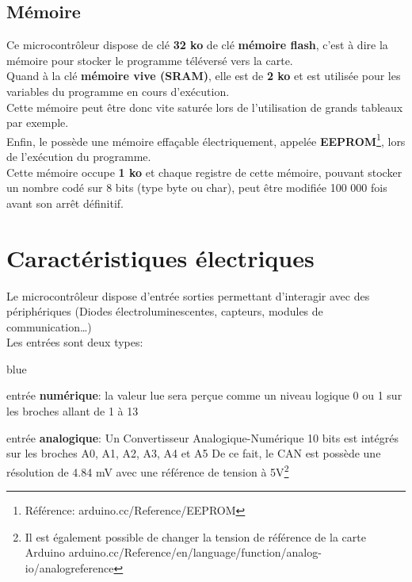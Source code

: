 \subsection{Mémoire}

Ce microcontrôleur dispose de clé \textbf{32 ko} de clé \textbf{mémoire flash}, c'est à dire la mémoire 
pour stocker le programme téléversé vers la carte. \\


Quand à la clé \textbf{mémoire vive (SRAM)}, elle est de \textbf{2 ko} et est utilisée pour les 
variables du programme en cours d’exécution. \\
Cette mémoire peut être donc vite saturée lors de l'utilisation de grands tableaux par exemple. \\


Enfin, le  possède une mémoire effaçable électriquement, appelée \textbf{EEPROM}\footnote{Référence: 
arduino.cc/Reference/EEPROM}, lors de l’exécution du programme. \\
Cette mémoire occupe \textbf{1 ko} et chaque registre de cette mémoire, pouvant stocker un nombre 
codé sur 8 bits (type byte ou char), peut être modifiée 100 000 fois avant son arrêt définitif.\\


\section{Caractéristiques électriques}

Le microcontrôleur dispose d'entrée sorties permettant d’interagir avec des périphériques 
(Diodes électroluminescentes, capteurs, modules de communication\ldots) \\

Les entrées sont deux types: 

\begin{items}{blue}{\Triangle}
\item entrée \textbf{numérique}: la valeur lue sera perçue comme un niveau logique 0 ou 1 sur les broches allant de 1 à 13
\item entrée \textbf{analogique}: Un Convertisseur Analogique-Numérique 10 bits est intégrés sur les broches A0, A1, A2, A3, A4 et A5
De ce fait, le CAN  est possède une résolution de 4.84 mV avec une référence de tension à 5V\footnote{Il est également possible de changer la tension de référence de la carte Arduino 
arduino.cc/Reference/en/language/function/analog-io/analogreference}
\end{items}

